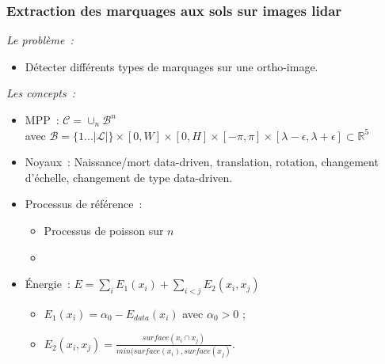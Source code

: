 \documentclass{beamer}
\begin{document}
\begin{frame}
\frametitle{Extraction des marquages aux sols sur images lidar}
\emph{Le probl\`eme~:} 
\begin{itemize}
\item Détecter différents types de marquages sur une ortho-image.
\end{itemize}
\emph{Les concepts~:}
\begin{itemize}
\item MPP~:  $\mathcal{C} = \cup_{n}\mathcal{B}^n$\\
avec $\mathcal{B}=\{1...\vert \mathcal{L}\vert\}\times [0,W]\times[0,H]\times[-\pi,\pi]\times[\lambda-\epsilon,\lambda + \epsilon] \subset  \mathds{R}^{5}$
\item Noyaux~: {\color{red}Naissance/mort data-driven}, translation, rotation, changement d'échelle, {\color{red}changement de type data-driven}. 
\item Processus de référence~:
\begin{itemize}
\item Processus de poisson sur $n$
\item {}
\end{itemize}
\item \'Energie~: $E = \sum_i E_1(x_i) + \sum_{i<j} E_2(x_i,x_j)$
\begin{itemize}
\item $E_1(x_i)=\alpha_{0} - E_{data}(x_i)$ avec $\alpha_{0}>0$ ;
\item $E_2(x_i,x_j) = \frac{surface(x_i \cap x_j)}{min(surface(x_i),surface(x_j)}$.
\end{itemize}
\end{itemize}
\end{frame}
%
\end{document}
